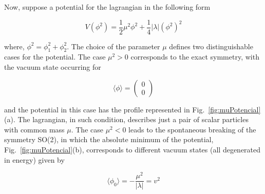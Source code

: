 Now, suppose a potential for the lagrangian in the following form

\begin{equation}
V(\phi^2) = \dfrac{1}{2}\mu^2 \phi^2 + \dfrac{1}{4} \vert \lambda \vert (\phi^2)^2
\end{equation}

where, $\phi^2 = \phi_1^2 + \phi_2^2$. The choice of the parameter $\mu$ defines two distinguishable cases for the potential. The case $\mu^2 > 0$ corresponds to the exact symmetry, with the vacuum state occurring for

\begin{equation}
\langle \phi \rangle = \left(\begin{aligned} 0 \\ 0 \end{aligned} \right)
\end{equation}

and the potential in this case has the profile represented in Fig.~\ref{fig:muPotencial}(a). The lagrangian, in such condition, describes just a pair of scalar particles with common mass $\mu$. The case $\mu^2 < 0$ leads to the spontaneous breaking of the symmetry SO(2), in which the absolute minimum of the potential, Fig.~\ref{fig:muPotencial}(b), corresponds to different vacuum states (all degenerated in energy) given by

\begin{equation}
\langle \phi_0 \rangle = - \dfrac{\mu^2}{\vert \lambda \vert} = v^2
\end{equation}

